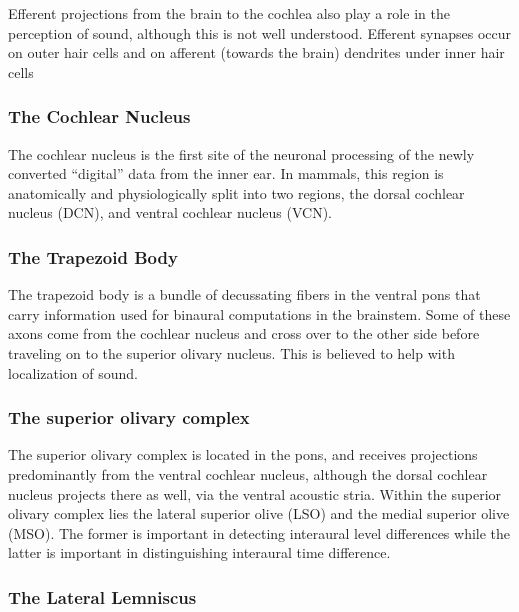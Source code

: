 Efferent projections from the brain to the cochlea also play a role in
the perception of sound, although this is not well understood. Efferent
synapses occur on outer hair cells and on afferent (towards the brain)
dendrites under inner hair cells

\hypertarget{the-cochlear-nucleus}{%
\subsubsection{The Cochlear Nucleus}\label{the-cochlear-nucleus}}

The cochlear nucleus is the first site of the neuronal processing of the
newly converted ``digital'' data from the inner ear. In mammals, this
region is anatomically and physiologically split into two regions, the
dorsal cochlear nucleus (DCN), and ventral cochlear nucleus (VCN).

\hypertarget{the-trapezoid-body}{%
\subsubsection{The Trapezoid Body}\label{the-trapezoid-body}}

The trapezoid body is a bundle of decussating fibers in the ventral pons
that carry information used for binaural computations in the brainstem.
Some of these axons come from the cochlear nucleus and cross over to the
other side before traveling on to the superior olivary nucleus. This is
believed to help with localization of sound.

\hypertarget{the-superior-olivary-complex}{%
\subsubsection{The superior olivary
complex}\label{the-superior-olivary-complex}}

The superior olivary complex is located in the pons, and receives
projections predominantly from the ventral cochlear nucleus, although
the dorsal cochlear nucleus projects there as well, via the ventral
acoustic stria. Within the superior olivary complex lies the lateral
superior olive (LSO) and the medial superior olive (MSO). The former is
important in detecting interaural level differences while the latter is
important in distinguishing interaural time difference.

\hypertarget{the-lateral-lemniscus}{%
\subsubsection{The Lateral Lemniscus}\label{the-lateral-lemniscus}}

